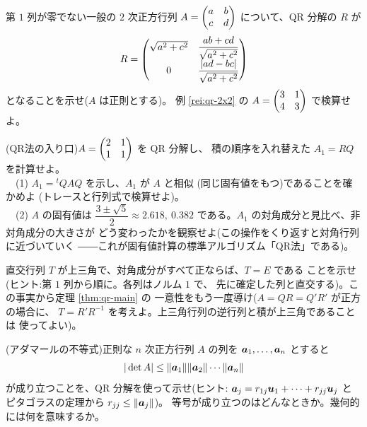 \begin{mondai}[発展]\label{q:qr-ex9}
第 $1$ 列が零でない一般の $2$ 次正方行列
$A = \begin{pmatrix}a & b \\ c & d\end{pmatrix}$ について、QR 分解の $R$ が
\[
R = \begin{pmatrix}\sqrt{a^2 + c^2} & \dfrac{ab + cd}{\sqrt{a^2 + c^2}} \\[2mm]
0 & \dfrac{|ad - bc|}{\sqrt{a^2 + c^2}}\end{pmatrix}
\]
となることを示せ($A$ は正則とする)。
例 \ref{rei:qr-2x2} の $A = \begin{pmatrix}3 & 1 \\ 4 & 3\end{pmatrix}$ で検算せよ。
\end{mondai}

\begin{mondai}[発展]\label{q:qr-ex10}
(QR法の入り口)$A = \begin{pmatrix}2 & 1 \\ 1 & 1\end{pmatrix}$ を QR 分解し、
積の順序を入れ替えた $A_1 = RQ$ を計算せよ。\\
　(1) $A_1 = {}^t\!QAQ$ を示し、$A_1$ が $A$ と相似
(同じ固有値をもつ)であることを確かめよ
(トレースと行列式で検算せよ)。\\
　(2) $A$ の固有値は $\dfrac{3 \pm \sqrt{5}}{2} \approx 2.618,\ 0.382$
である。$A_1$ の対角成分と見比べ、非対角成分の大きさが
どう変わったかを観察せよ(この操作をくり返すと対角行列に近づいていく
――これが固有値計算の標準アルゴリズム「QR法」である)。
\end{mondai}

\begin{mondai}[証明]\label{q:qr-ex11}
直交行列 $T$ が上三角で、対角成分がすべて正ならば、$T = E$ である
ことを示せ(ヒント:第 $1$ 列から順に。各列はノルム $1$ で、
先に確定した列と直交する)。この事実から定理 \ref{thm:qr-main} の
一意性をもう一度導け($A = QR = Q'R'$ が正方の場合に、
$T = R'R^{-1}$ を考えよ。上三角行列の逆行列と積が上三角であることは
使ってよい)。
\end{mondai}

\begin{mondai}[証明]\label{q:qr-ex12}
(アダマールの不等式)正則な $n$ 次正方行列 $A$ の列を
$\bm{a}_1, \dots, \bm{a}_n$ とすると
\[
|\det A| \le \|\bm{a}_1\| \|\bm{a}_2\| \cdots \|\bm{a}_n\|
\]
が成り立つことを、QR 分解を使って示せ(ヒント:
$\bm{a}_j = r_{1j}\bm{u}_1 + \cdots + r_{jj}\bm{u}_j$ と
ピタゴラスの定理から $r_{jj} \le \|\bm{a}_j\|$)。
等号が成り立つのはどんなときか。幾何的には何を意味するか。
\end{mondai}

